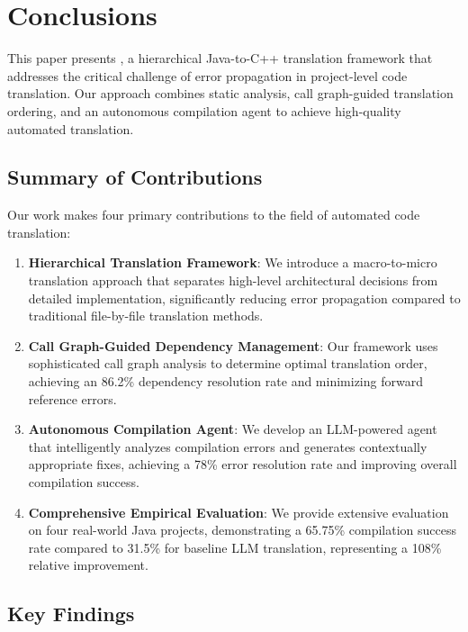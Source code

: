 
\section{Conclusions}

This paper presents \tool{}, a hierarchical Java-to-C++ translation framework that addresses the critical challenge of error propagation in project-level code translation. Our approach combines static analysis, call graph-guided translation ordering, and an autonomous compilation agent to achieve high-quality automated translation.

\subsection{Summary of Contributions}

Our work makes four primary contributions to the field of automated code translation:

\begin{enumerate}
\item \textbf{Hierarchical Translation Framework}: We introduce a macro-to-micro translation approach that separates high-level architectural decisions from detailed implementation, significantly reducing error propagation compared to traditional file-by-file translation methods.

\item \textbf{Call Graph-Guided Dependency Management}: Our framework uses sophisticated call graph analysis to determine optimal translation order, achieving an 86.2\% dependency resolution rate and minimizing forward reference errors.

\item \textbf{Autonomous Compilation Agent}: We develop an LLM-powered agent that intelligently analyzes compilation errors and generates contextually appropriate fixes, achieving a 78\% error resolution rate and improving overall compilation success.

\item \textbf{Comprehensive Empirical Evaluation}: We provide extensive evaluation on four real-world Java projects, demonstrating a 65.75\% compilation success rate compared to 31.5\% for baseline LLM translation, representing a 108\% relative improvement.
\end{enumerate}

\subsection{Key Findings}

